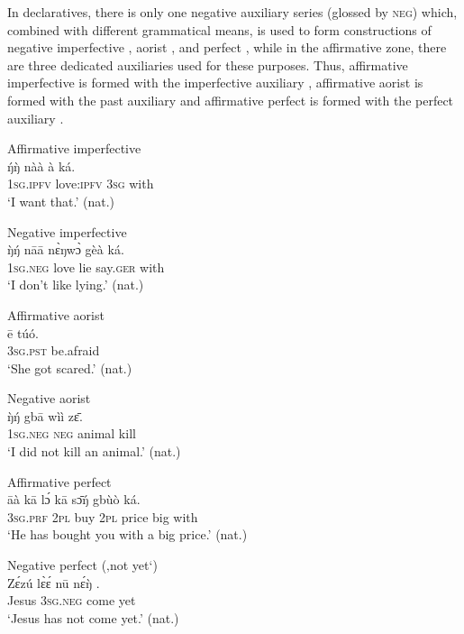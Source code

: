 \documentclass[output=paper,colorlinks,citecolor=brown]{langscibook}
\begin{document}
In declaratives, there is only one negative auxiliary series (glossed by \textsc{neg}) which, combined with different grammatical means, is used to form constructions of negative imperfective , aorist , and perfect , while in the affirmative zone, there are three dedicated auxiliaries used for these purposes. Thus, affirmative imperfective is formed with the imperfective auxiliary , affirmative aorist is formed with the past auxiliary  and affirmative perfect is formed with the perfect auxiliary . 

\ea\label{ex:mano:2}Affirmative imperfective\\
    \gll \'{ŋ}\`{ŋ} nàà à ká.\\
         \textsc{1sg.ipfv} love\textsc{:ipfv} 3\textsc{sg} with    \\
    \glt ‘I want that.’ (nat.)
\z


\ea\label{ex:mano:3}Negative imperfective\\
    \gll \`{ŋ}\'{ŋ} nāā nɛ̀ŋwɔ̀ gèà ká.\\
         1\textsc{sg.neg} love lie say.\textsc{ger} with   \\
    \glt ‘I don’t like lying.’ (nat.)
\z


\ea\label{ex:mano:4}Affirmative aorist\\
    \gll ē túó.\\
         \textsc{3sg.pst} be.afraid     \\
    \glt ‘She got scared.’ (nat.)
\z

\newpage
\ea\label{ex:mano:5}Negative aorist\\
    \gll \`{ŋ}\'{ŋ} gbā wìì zɛ̄.\\
         \textsc{1sg.neg} \textsc{neg} animal kill    \\
    \glt ‘I did not kill an animal.’ (nat.)
\z


\ea\label{ex:mano:6}Affirmative perfect\\
    \gll āà kā lɔ́ kā sɔ̄ŋ́ gbùò ká. \\
         \textsc{3sg.prf} \textsc{2pl} buy \textsc{2pl} price big with \\
    \glt ‘He has bought you with a big price.’ (nat.)
\z


\ea\label{ex:mano:7}Negative perfect (‚not yet‘)\\
    \gll Zɛ́zú lɛ̀ɛ́ nū nɛ́ŋ̀ . \\
     Jesus 3\textsc{sg.neg} come yet    \\
    \glt ‘Jesus has not come yet.’ (nat.)
\z
\end{document}
